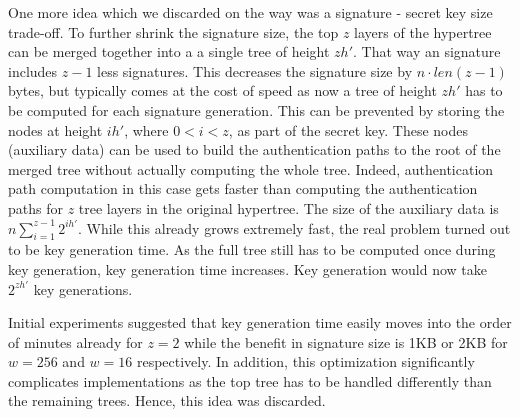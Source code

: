 One more idea which we discarded on the way was a
signature - secret key size trade-off.
To further shrink the \spx signature size, the top $z$ layers of the
hypertree can be merged together into a a single tree of height $zh'$. That way
an \spx signature includes $z-1$ less \wotsp signatures. This decreases the
signature size by $n\cdot len(z-1)$ bytes, but typically comes at
the cost of speed as now a tree of height $zh'$ has to be computed for
each signature generation.
This can be prevented by storing the
%
nodes at height $ih'$, where $0 < i < z$, %
as part of the secret key. These nodes (auxiliary data) can
be used to build the authentication paths to the root of the merged tree without
actually computing the whole tree. Indeed, authentication path computation in
this case gets faster than computing the authentication paths for $z$ tree layers
in the original hypertree.
The size of the auxiliary data
is %
%
%
$n \sum_{i=1}^{z-1} 2^{ih'}$. %
While this already grows extremely fast, the real problem turned out to be
key generation time. As the full tree still has to be
computed once during key generation, key generation time increases.
Key generation would now take
$2^{zh'}$ \wotsp key generations.

Initial experiments suggested that key generation time easily moves into
the order of minutes already for $z=2$ while the benefit in signature size is
1KB or 2KB for $w=256$ and $w=16$ respectively. In addition, this optimization
significantly complicates implementations as the top tree has to be handled
differently than the remaining trees. Hence, this idea was discarded.
